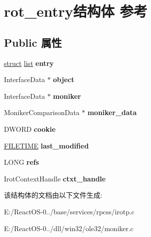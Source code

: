 \hypertarget{structrot__entry}{}\section{rot\+\_\+entry结构体 参考}
\label{structrot__entry}
\subsection*{Public 属性}
\begin{DoxyCompactItemize}
\item 
\mbox{\label{structrot__entry_a46cbf133485543e646a6785015ee297b}} 
\hyperlink{interfacestruct}{struct} \hyperlink{classlist}{list} {\bfseries entry}
\item 
\mbox{\label{structrot__entry_a54756abc7db4d2d199d33276469a0e02}} 
Interface\+Data $\ast$ {\bfseries object}
\item 
\mbox{\label{structrot__entry_a9f856ca97da5ebef30ca8398d9596354}} 
Interface\+Data $\ast$ {\bfseries moniker}
\item 
\mbox{\label{structrot__entry_a595de3589cbebb0a81e53a168fd4f508}} 
Moniker\+Comparison\+Data $\ast$ {\bfseries moniker\+\_\+data}
\item 
\mbox{\label{structrot__entry_a7c99942829d13aecb8dd4ca372560bc2}} 
D\+W\+O\+RD {\bfseries cookie}
\item 
\mbox{\label{structrot__entry_aa9b68283bf3ab18a0e2acde52f30e648}} 
\hyperlink{struct___f_i_l_e_t_i_m_e}{F\+I\+L\+E\+T\+I\+ME} {\bfseries last\+\_\+modified}
\item 
\mbox{\label{structrot__entry_a0076eae3ad9cd566ffbe3c907461ab7c}} 
L\+O\+NG {\bfseries refs}
\item 
\mbox{\label{structrot__entry_a02cc4967c85c531de9e20e1fa74b6beb}} 
Irot\+Context\+Handle {\bfseries ctxt\+\_\+handle}
\end{DoxyCompactItemize}


该结构体的文档由以下文件生成\+:\begin{DoxyCompactItemize}
\item 
E\+:/\+React\+O\+S-\/0../base/services/rpcss/irotp.\+c\item 
E\+:/\+React\+O\+S-\/0../dll/win32/ole32/moniker.\+c\end{DoxyCompactItemize}
